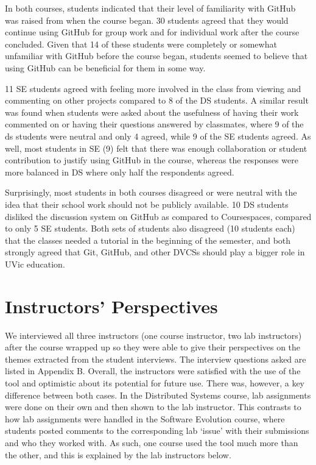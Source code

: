 In both courses, students indicated that their level of familiarity with GitHub was raised from when the course began. 30 students agreed that they would continue using GitHub for group work and for individual work after the course concluded. Given that 14 of these students were completely or somewhat unfamiliar with GitHub before the course began, students seemed to believe that using GitHub can be beneficial for them in some way.

11 SE students agreed with feeling more involved in the class from viewing and commenting on other projects compared to 8 of the DS students. A similar result was found when students were asked about the usefulness of having their work commented on or having their questions answered by classmates, where 9 of the ds students were neutral and only 4 agreed, while 9 of the SE students agreed. As well, most students in SE (9) felt that there was enough collaboration or student contribution to justify using GitHub in the course, whereas the responses were more balanced in DS where only half the respondents agreed.

Surprisingly, most students in both courses disagreed or were neutral with the idea that their school work should not be publicly available. 10 DS students disliked the discussion system on GitHub as compared to Coursespaces, compared to only 5 SE students. Both sets of students also disagreed (10 students each) that the classes needed a tutorial in the beginning of the semester, and both strongly agreed that Git, GitHub, and other DVCSs should play a bigger role in UVic education.

\section{Instructors' Perspectives}
We interviewed all three instructors (one course instructor, two lab instructors) after the course wrapped up so they were able to give their perspectives on the themes extracted from the student interviews. The interview questions asked are listed in Appendix B. Overall, the instructors were satisfied with the use of the tool and optimistic about its potential for future use. There was, however, a key difference between both cases. In the Distributed Systems course, lab assignments were done on their own and then shown to the lab instructor. This contrasts to how lab assignments were handled in the Software Evolution course, where students posted comments to the corresponding lab `issue' with their submissions and who they worked with. As such, one course used the tool much more than the other, and this is explained by the lab instructors below.

